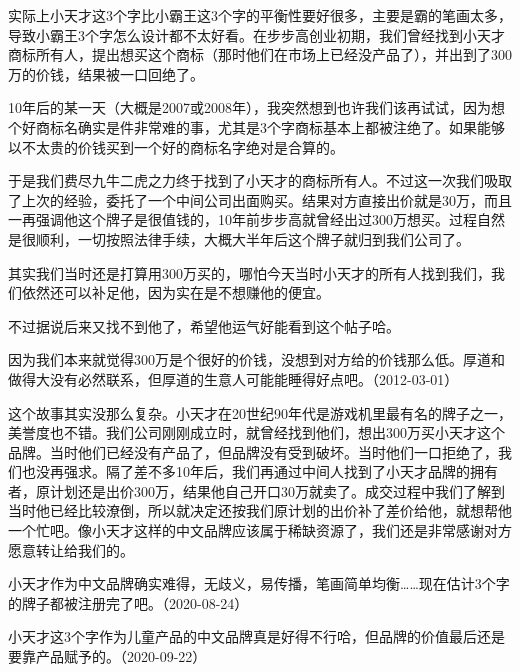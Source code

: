 实际上小天才这3个字比小霸王这3个字的平衡性要好很多，主要是霸的笔画太多，导致小霸王3个字怎么设计都不太好看。在步步高创业初期，我们曾经找到小天才商标所有人，提出想买这个商标（那时他们在市场上已经没产品了），并出到了300万的价钱，结果被一口回绝了。

10年后的某一天（大概是2007或2008年），我突然想到也许我们该再试试，因为想个好商标名确实是件非常难的事，尤其是3个字商标基本上都被注绝了。如果能够以不太贵的价钱买到一个好的商标名字绝对是合算的。

于是我们费尽九牛二虎之力终于找到了小天才的商标所有人。不过这一次我们吸取了上次的经验，委托了一个中间公司出面购买。结果对方直接出价就是30万，而且一再强调他这个牌子是很值钱的，10年前步步高就曾经出过300万想买。过程自然是很顺利，一切按照法律手续，大概大半年后这个牌子就归到我们公司了。

其实我们当时还是打算用300万买的，哪怕今天当时小天才的所有人找到我们，我们依然还可以补足他，因为实在是不想赚他的便宜。

不过据说后来又找不到他了，希望他运气好能看到这个帖子哈。


因为我们本来就觉得300万是个很好的价钱，没想到对方给的价钱那么低。厚道和做得大没有必然联系，但厚道的生意人可能能睡得好点吧。（2012-03-01）



这个故事其实没那么复杂。小天才在20世纪90年代是游戏机里最有名的牌子之一，美誉度也不错。我们公司刚刚成立时，就曾经找到他们，想出300万买小天才这个品牌。当时他们已经没有产品了，但品牌没有受到破坏。当时他们一口拒绝了，我们也没再强求。隔了差不多10年后，我们再通过中间人找到了小天才品牌的拥有者，原计划还是出价300万，结果他自己开口30万就卖了。成交过程中我们了解到当时他已经比较潦倒，所以就决定还按我们原计划的出价补了差价给他，就想帮他一个忙吧。像小天才这样的中文品牌应该属于稀缺资源了，我们还是非常感谢对方愿意转让给我们的。

小天才作为中文品牌确实难得，无歧义，易传播，笔画简单均衡……现在估计3个字的牌子都被注册完了吧。（2020-08-24）

小天才这3个字作为儿童产品的中文品牌真是好得不行哈，但品牌的价值最后还是要靠产品赋予的。（2020-09-22）

